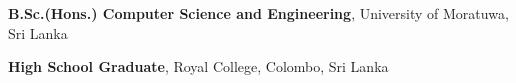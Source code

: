 
\vspace*{0.2cm}
\begin{scholarship}
					{\textbf{B.Sc.(Hons.) Computer Science and Engineering}, University of Moratuwa, Sri Lanka}
				
					{\textbf{High School Graduate}, Royal College, Colombo, Sri Lanka}

	
\end{scholarship}